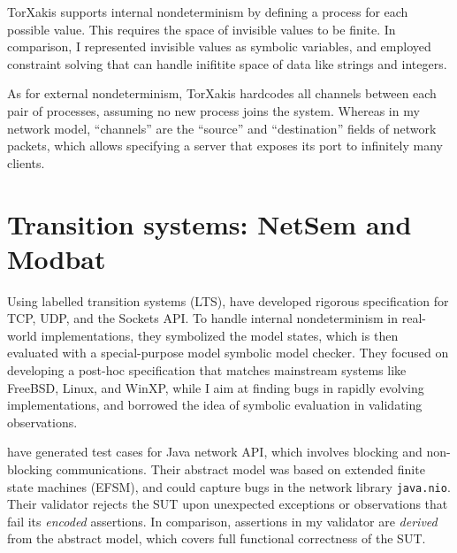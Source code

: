 TorXakis supports internal nondeterminism by defining a process for each
possible value.  This requires the space of invisible values to be finite.  In
comparison, I represented invisible values as symbolic variables, and employed
constraint solving that can handle inifitite space of data like strings and
integers.

As for external nondeterminism, TorXakis hardcodes all channels between each
pair of processes, assuming no new process joins the system.  Whereas in my
network model, ``channels'' are the ``source'' and ``destination'' fields of
network packets, which allows specifying a server that exposes its port to
infinitely many clients.

\section{Transition systems: NetSem and Modbat}
Using labelled transition systems (LTS), \citet{netsem} have developed rigorous
specification for TCP, UDP, and the Sockets API.  To handle internal
nondeterminism in real-world implementations, they symbolized the model states,
which is then evaluated with a special-purpose model symbolic model checker.
They focused on developing a post-hoc specification that matches mainstream
systems like FreeBSD, Linux, and WinXP, while I aim at finding bugs in rapidly
evolving implementations, and borrowed the idea of symbolic evaluation in
validating observations.

\citet{modbat} have generated test cases for Java network API, which involves
blocking and non-blocking communications.  Their abstract model was based on
extended finite state machines (EFSM), and could capture bugs in the network
library \verb|java.nio|.  Their validator rejects the SUT upon unexpected
exceptions or observations that fail its {\em encoded} assertions.  In
comparison, assertions in my validator are {\em derived} from the abstract
model, which covers full functional correctness of the SUT.
